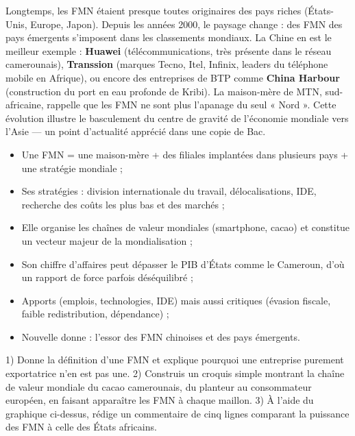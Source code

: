\documentclass[11pt]{article}
\newcommand{\cle}[1]{{\popxbold\color{popdark}#1}}
\begin{document}
Longtemps, les FMN étaient presque toutes originaires des pays riches (États-Unis, Europe, Japon). Depuis les années 2000, le paysage change : des FMN des \cle{pays émergents} s'imposent dans les classements mondiaux. La Chine en est le meilleur exemple : \textbf{Huawei} (télécommunications, très présente dans le réseau camerounais), \textbf{Transsion} (marques Tecno, Itel, Infinix, leaders du téléphone mobile en Afrique), ou encore des entreprises de BTP comme \textbf{China Harbour} (construction du port en eau profonde de Kribi). La maison-mère de MTN, sud-africaine, rappelle que les FMN ne sont plus l'apanage du seul « Nord ». Cette évolution illustre le basculement du centre de gravité de l'économie mondiale vers l'Asie — un point d'actualité apprécié dans une copie de Bac.

\begin{aretenir}
\begin{itemize}
\item Une FMN = une maison-mère + des filiales implantées dans plusieurs pays + une stratégie mondiale ;
\item Ses stratégies : division internationale du travail, délocalisations, IDE, recherche des coûts les plus bas et des marchés ;
\item Elle organise les chaînes de valeur mondiales (smartphone, cacao) et constitue un vecteur majeur de la mondialisation ;
\item Son chiffre d'affaires peut dépasser le PIB d'États comme le Cameroun, d'où un rapport de force parfois déséquilibré ;
\item Apports (emplois, technologies, IDE) mais aussi critiques (évasion fiscale, faible redistribution, dépendance) ;
\item Nouvelle donne : l'essor des FMN chinoises et des pays émergents.
\end{itemize}
\end{aretenir}

\begin{exercice}
1) Donne la définition d'une FMN et explique pourquoi une entreprise purement exportatrice n'en est pas une. 2) Construis un croquis simple montrant la chaîne de valeur mondiale du cacao camerounais, du planteur au consommateur européen, en faisant apparaître les FMN à chaque maillon. 3) À l'aide du graphique ci-dessus, rédige un commentaire de cinq lignes comparant la puissance des FMN à celle des États africains.
\end{exercice}
\end{document}
